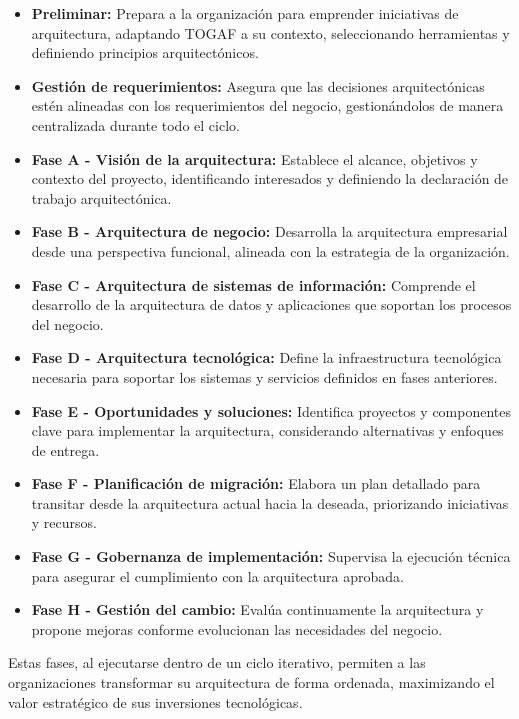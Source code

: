 \begin{itemize}
	\item \textbf{Preliminar:} Prepara a la organización para emprender iniciativas de arquitectura, adaptando TOGAF a su contexto, seleccionando herramientas y definiendo principios arquitectónicos.
	
	\item \textbf{Gestión de requerimientos:} Asegura que las decisiones arquitectónicas estén alineadas con los requerimientos del negocio, gestionándolos de manera centralizada durante todo el ciclo.
	
	\item \textbf{Fase A - Visión de la arquitectura:} Establece el alcance, objetivos y contexto del proyecto, identificando interesados y definiendo la declaración de trabajo arquitectónica.
	
	\item \textbf{Fase B - Arquitectura de negocio:} Desarrolla la arquitectura empresarial desde una perspectiva funcional, alineada con la estrategia de la organización.
	
	\item \textbf{Fase C - Arquitectura de sistemas de información:} Comprende el desarrollo de la arquitectura de datos y aplicaciones que soportan los procesos del negocio.
	
	\item \textbf{Fase D - Arquitectura tecnológica:} Define la infraestructura tecnológica necesaria para soportar los sistemas y servicios definidos en fases anteriores.
	
	\item \textbf{Fase E - Oportunidades y soluciones:} Identifica proyectos y componentes clave para implementar la arquitectura, considerando alternativas y enfoques de entrega.
	
	\item \textbf{Fase F - Planificación de migración:} Elabora un plan detallado para transitar desde la arquitectura actual hacia la deseada, priorizando iniciativas y recursos.
	
	\item \textbf{Fase G - Gobernanza de implementación:} Supervisa la ejecución técnica para asegurar el cumplimiento con la arquitectura aprobada.
	
	\item \textbf{Fase H - Gestión del cambio:} Evalúa continuamente la arquitectura y propone mejoras conforme evolucionan las necesidades del negocio.
\end{itemize}

Estas fases, al ejecutarse dentro de un ciclo iterativo, permiten a las organizaciones transformar su arquitectura de forma ordenada, maximizando el valor estratégico de sus inversiones tecnológicas.
